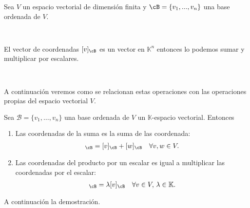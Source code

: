 \documentclass[handout]{beamer} %
\newcommand{\K}{\mathbb K}
\begin{document}
	
	\begin{frame}
	Sea $V$ un espacio vectorial de dimensión finita y $\cB=\{v_1, ..., v_n\}$ una base ordenada de $V$.\pause
	
	\
	
	El vector de coordenadas $[v]_\cB$ es un vector en $\K^n$ entonces lo podemos sumar y multiplicar por escalares. \pause
	
	\
	
	A continuación veremos como se relacionan estas operaciones con las operaciones propias del espacio vectorial $V$.
	\end{frame}
	
	\begin{frame}

	\begin{proposicion}[3.5.2]\label{vectorbase->lineal}
		Sea $\mathcal{B}=\{v_1,\ldots,v_n\}$ una base ordenada de $V$ un $\K$-espacio vectorial. Entonces\pause
		\begin{enumerate}
			\item\label{itm-coor-1}Las coordenadas de la suma es la suma de las coordenada:
			\begin{align*}
			[v+w]_\cB=[v]_\cB+[w]_\cB\quad\forall v,w\in V .
			\end{align*}\pause
			\item\label{itm-coor-2} Las coordenadas del producto por un escalar es igual a multiplicar las coordenadas por el escalar:
			\begin{align*}
			[\lambda v]_\cB=\lambda[v]_\cB\quad\forall v\in V,\,\lambda\in\K.
			\end{align*}
		\end{enumerate}
	\end{proposicion} 	
	\pause
	
	A continuación la demostración.
	
	\end{frame}
	
\end{document}
